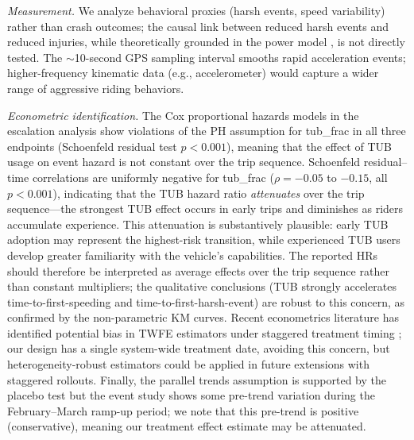 \textit{Measurement.} We analyze behavioral proxies (harsh events, speed variability) rather than crash outcomes; the causal link between reduced harsh events and reduced injuries, while theoretically grounded in the power model \citep{elvik2013reexamination}, is not directly tested. The $\sim$10-second GPS sampling interval smooths rapid acceleration events; higher-frequency kinematic data (e.g., accelerometer) would capture a wider range of aggressive riding behaviors.

\textit{Econometric identification.} The Cox proportional hazards models in the escalation analysis show violations of the PH assumption for tub\_frac in all three endpoints (Schoenfeld residual test $p < 0.001$), meaning that the effect of TUB usage on event hazard is not constant over the trip sequence. Schoenfeld residual--time correlations are uniformly negative for tub\_frac ($\rho = -0.05$ to $-0.15$, all $p < 0.001$), indicating that the TUB hazard ratio \textit{attenuates} over the trip sequence---the strongest TUB effect occurs in early trips and diminishes as riders accumulate experience. This attenuation is substantively plausible: early TUB adoption may represent the highest-risk transition, while experienced TUB users develop greater familiarity with the vehicle's capabilities. The reported HRs should therefore be interpreted as average effects over the trip sequence rather than constant multipliers; the qualitative conclusions (TUB strongly accelerates time-to-first-speeding and time-to-first-harsh-event) are robust to this concern, as confirmed by the non-parametric KM curves. Recent econometrics literature has identified potential bias in TWFE estimators under staggered treatment timing \citep{goodman2021difference}; our design has a single system-wide treatment date, avoiding this concern, but heterogeneity-robust estimators could be applied in future extensions with staggered rollouts. Finally, the parallel trends assumption is supported by the placebo test but the event study shows some pre-trend variation during the February--March ramp-up period; we note that this pre-trend is positive (conservative), meaning our treatment effect estimate may be attenuated.
